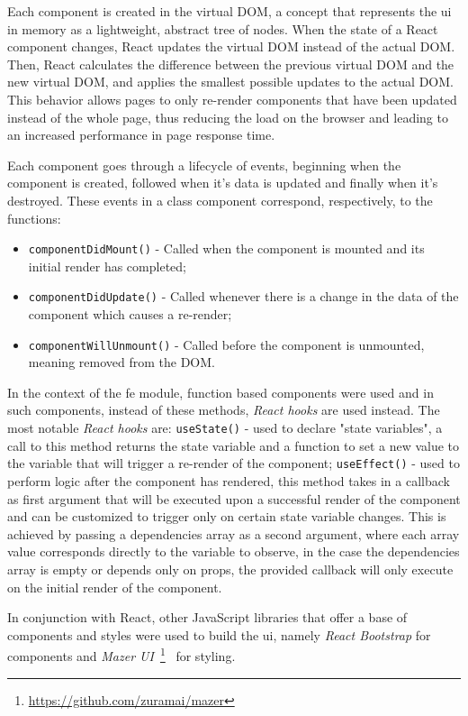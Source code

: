 Each component is created in the virtual DOM, a concept that represents the \acrshort{ui} in memory as a lightweight, abstract tree of nodes. When the state of a React component changes, React updates the virtual DOM instead of the actual DOM. Then, React calculates the difference between the previous virtual DOM and the new virtual DOM, and applies the smallest possible updates to the actual DOM. This behavior allows pages to only re-render components that have been updated instead of the whole page, thus reducing the load on the browser and leading to an increased performance in page response time.

Each component goes through a lifecycle of events, beginning when the component is created, followed when it's data is updated and finally when it's destroyed. These events in a class component correspond, respectively, to the functions:
\begin{itemize}
    \item \lstinline{componentDidMount()} - Called when the component is mounted and its initial render has completed;
    \item \lstinline{componentDidUpdate()} - Called whenever there is a change in the data of the component which causes a re-render;
    \item \lstinline{componentWillUnmount()} - Called before the component is unmounted, meaning removed from the DOM.
\end{itemize}

In the context of the \acrshort{fe} module, function based components were used and in such components, instead of these methods, \textit{React hooks} are used instead. The most notable \textit{React hooks} are: \lstinline{useState()} - used to declare "state variables", a call to this method returns the state variable and a function to set a new value to the variable that will trigger a re-render of the component; \lstinline{useEffect()} - used to perform logic after the component has rendered, this method takes in a callback as first argument that will be executed upon a successful render of the component and can be customized to trigger only on certain state variable changes. This is achieved by passing a dependencies array as a second argument, where each array value corresponds directly to the variable to observe, in the case the dependencies array is empty or depends only on props, the provided callback will only execute on the initial render of the component.

In conjunction with React, other JavaScript libraries that offer a base of components and styles were used to build the \acrshort{ui}, namely \textit{React Bootstrap} for components and \textit{Mazer UI}~\footnote{\url{https://github.com/zuramai/mazer}}~\label{fn:mazer-ui} for styling.

